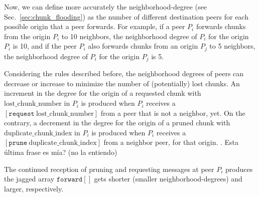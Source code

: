 Now, we can define more accurately the \gls{neighborhood-degree} (see
Sec.~\ref{sec:chunk_flooding}) as the number of different destination
peers for each possible origin that a peer forwards. For example, if a
peer $P_i$ forwards chunks from the origin $P_i$ to 10 neighbors, the
neighborhood degree of $P_i$ for the origin $P_i$ is 10, and if the
peer $P_i$ also forwards chunks from an origin $P_j$ to 5 neighbors,
the neighborhood degree of $P_i$ for the origin $P_j$ is 5.

Considering the rules described before, the neighborhood degrees of
peers can decrease or increase to minimize the number of (potentially) lost chunks. An increment in the degree for the origin of a requested
chunk with $\text{lost\_chunk\_number}$ in $P_i$ is produced when $P_i$
receives a $[\mathtt{request}~\text{lost\_chunk\_number}]$ from a peer
that is not a neighbor, yet.  On the contrary, a decrement in the
degree for the origin of a pruned chunk with 
$\text{duplicate\_chunk\_index}$ in $P_i$ is produced when $P_i$
receives a $[\mathtt{prune}~\text{duplicate\_chunk\_index}]$ from a
neighbor peer, for that origin. . {\color{red} Esta \'ultima frase es m\'ia? (no la entiendo)}

The continued reception of pruning and requesting messages at peer $P_i$ produces the jagged array
$\mathtt{forward}[]$ gets shorter (smaller \gls{neighborhood-degree}s) and larger, respectively.
